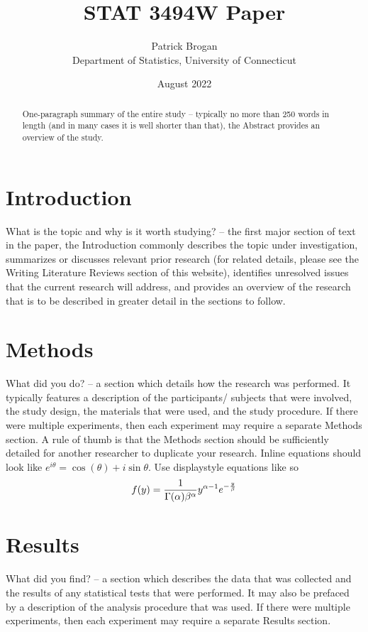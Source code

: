 \documentclass[12pt, letterpaper, twoside]{article}
\title{STAT 3494W Paper}
\author{Patrick Brogan\\[1ex]
  Department of Statistics, University of Connecticut\\}
\date{August 2022}
\begin{document}
\maketitle

\begin{abstract}
One-paragraph summary of the entire study – typically no more than
250 words in length (and in many cases it is well shorter than that),
the Abstract provides an overview of the study.
\end{abstract}

\section*{Introduction}
What is the topic and why is it worth studying? – the first major
section of text in the paper, the Introduction commonly describes
the topic under investigation, summarizes or discusses relevant
prior research (for related details, please see the Writing Literature
Reviews section of this website), identifies unresolved issues that
the current research will address, and provides an overview of the
research that is to be described in greater detail in the sections to
follow.

\section*{Methods}
What did you do? – a section which details how the research was
performed.  It typically features a description of the participants/
subjects that were involved, the study design, the materials that were
used, and the study procedure.  If there were multiple experiments,
then each experiment may require a separate Methods section.  A rule
of thumb is that the Methods section should be sufficiently detailed
for another researcher to duplicate your research. Inline equations should look like \(e^{i\theta} = \cos(\theta) + i\sin\theta\). Use displaystyle equations like so \begin{equation}
  \label{eq:ks_standard}
  f(y) = \frac{1}{\Gamma(\alpha)\beta^\alpha}\*y^{\alpha-1}e^{-\frac{y}{\beta}}
\end{equation}

\section*{Results}
What did you find? – a section which describes the data that was
collected and the results of any statistical tests that were performed.
It may also be prefaced by a description of the analysis procedure that
was used. If there were multiple experiments, then each experiment may
require a separate Results section.
\end{document}
